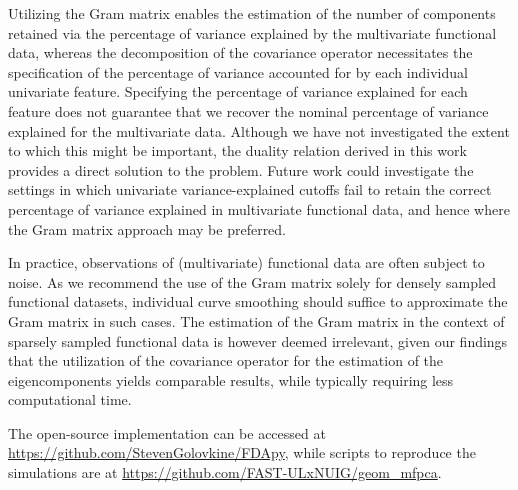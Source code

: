 Utilizing the Gram matrix enables the estimation of the number of components retained via the percentage of variance explained by the multivariate functional data, whereas the decomposition of the covariance operator necessitates the specification of the percentage of variance accounted for by each individual univariate feature. Specifying the percentage of variance explained for each feature does not guarantee that we recover the nominal percentage of variance explained for the multivariate data. Although we have not investigated the extent to which this might be important, the duality relation derived in this work provides a direct solution to the problem. Future work could investigate the settings in which univariate variance-explained cutoffs fail to retain the correct percentage of variance explained in multivariate functional data, and hence where the Gram matrix approach may be preferred.

In practice, observations of (multivariate) functional data are often subject to noise. As we recommend the use of the Gram matrix solely for densely sampled functional datasets, individual curve smoothing should suffice to approximate the Gram matrix in such cases. The estimation of the Gram matrix in the context of sparsely sampled functional data is however deemed irrelevant, given our findings that the utilization of the covariance operator for the estimation of the eigencomponents yields comparable results, while typically requiring less computational time.

The open-source implementation can be accessed at \url{https://github.com/StevenGolovkine/FDApy}, while scripts to reproduce the simulations are at \url{https://github.com/FAST-ULxNUIG/geom_mfpca}.


